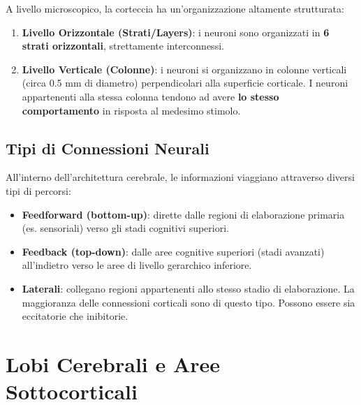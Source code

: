 A livello microscopico, la corteccia ha un'organizzazione altamente strutturata:
\begin{enumerate}
    \item \textbf{Livello Orizzontale (Strati/Layers)}: i neuroni sono organizzati in \textbf{6 strati orizzontali}, strettamente interconnessi.
    \item \textbf{Livello Verticale (Colonne)}: i neuroni si organizzano in colonne verticali (circa 0.5 mm di diametro) perpendicolari alla superficie corticale. I neuroni appartenenti alla stessa colonna tendono ad avere \textbf{lo stesso comportamento} in risposta al medesimo stimolo.
\end{enumerate}

\subsection{Tipi di Connessioni Neurali}
All'interno dell'architettura cerebrale, le informazioni viaggiano attraverso diversi tipi di percorsi:
\begin{itemize}
    \item \textbf{Feedforward (bottom-up)}: dirette dalle regioni di elaborazione primaria (es. sensoriali) verso gli stadi cognitivi superiori.
    \item \textbf{Feedback (top-down)}: dalle aree cognitive superiori (stadi avanzati) all'indietro verso le aree di livello gerarchico inferiore.
    \item \textbf{Laterali}: collegano regioni appartenenti allo stesso stadio di elaborazione. La maggioranza delle connessioni corticali sono di questo tipo. Possono essere sia eccitatorie che inibitorie.
\end{itemize}

\section{Lobi Cerebrali e Aree Sottocorticali}

